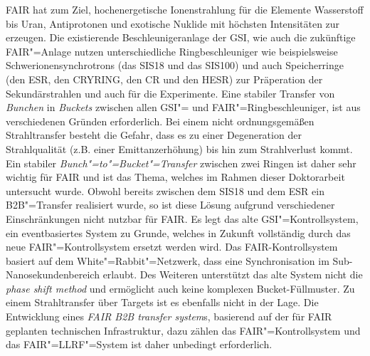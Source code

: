 FAIR hat zum Ziel, hochenergetische Ionenstrahlung für die Elemente Wasserstoff bis Uran, Antiprotonen und exotische Nuklide mit h\"ochsten  Intensit\"aten zur erzeugen. Die existierende Beschleunigeranlage der GSI, wie auch die zukünftige FAIR"=Anlage nutzen unterschiedliche Ringbeschleuniger wie beispielsweise Schwerionensynchrotrons (das SIS18 und das SIS100) und auch Speicherringe (den ESR, den CRYRING, den CR und den HESR) zur Pr\"aperation der Sekund\"arstrahlen und auch f\"ur die Experimente.  Eine stabiler Transfer von \textit{Bunchen} in \textit{Buckets} zwischen allen GSI"= und FAIR"=Ringbeschleuniger, ist aus verschiedenen Gr\"unden erforderlich. Bei einem nicht ordnungsgem\"a\ss{}en Strahltransfer besteht die Gefahr, dass es zu einer Degeneration der Strahlqualit\"at (z.B.  einer Emittanzerh\"ohung) bis hin zum Strahlverlust kommt. Ein stabiler \textit{Bunch"=to"=Bucket"=Transfer} zwischen zwei Ringen ist daher sehr wichtig f\"ur FAIR und ist das Thema, welches im Rahmen dieser Doktorarbeit untersucht wurde. Obwohl bereits zwischen dem SIS18 und dem ESR ein B2B"=Transfer realisiert wurde, so ist diese L\"osung aufgrund verschiedener Einschr\"ankungen nicht nutzbar f\"ur FAIR. Es legt das alte GSI"=Kontrollsystem, ein eventbasiertes System zu Grunde, welches in Zukunft vollst\"andig durch das neue FAIR"=Kontrollsystem ersetzt werden wird. Das FAIR-Kontrollsystem basiert auf dem White"=Rabbit"=Netzwerk, dass eine Synchronisation im Sub-Nanosekundenbereich erlaubt. Des Weiteren unterst\"utzt das alte System nicht die \textit{phase shift method} und erm\"oglicht auch keine komplexen Bucket-F\"ullmuster. Zu einem Strahltransfer \"uber Targets ist es ebenfalls nicht in der Lage. Die Entwicklung eines \textit{FAIR B2B transfer system}s, basierend auf der f\"ur FAIR geplanten technischen Infrastruktur, dazu z\"ahlen das FAIR"=Kontrollsystem und das FAIR"=LLRF"=System ist daher unbedingt erforderlich.

